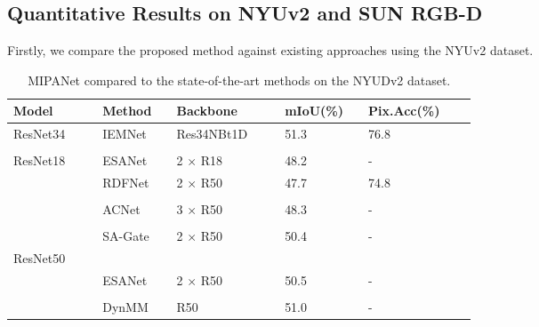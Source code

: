 \documentclass{aims}
\numberwithin{equation}{section}
\begin{document}
\subsection{Quantitative Results on NYUv2 and SUN RGB-D}
Firstly, we compare the proposed method against existing approaches using the NYUv2 dataset.

\begin{table}[!htb]
  \centering
  \caption{MIPANet compared to the state-of-the-art methods on the NYUDv2 dataset.}
    \begin{tabular}{lllllllllllll}
    \toprule
    \toprule
    Model &       &       & Method &       &        Backbone &       &       & mIoU(\%)  &       &        Pix.Acc(\%) \\
    \midrule
    ResNet34 &       &       & IEMNet\cite{xu2023interactive}  &       &        Res34NBt1D &       &       & 51.3  &       &       76.8 \\
    \midrule
    &       &       &       &       &       &       &       &       &       &       &         \\
    ResNet18 &       &       & ESANet\cite{seichter2021efficient} &       &        2 $\times$ R18 &       &       & 48.2  &       &        - \\
    \midrule
          &       &       & RDFNet\cite{park2017rdfnet} &       &        2 $\times$  R50 &       &       & 47.7  &       &       74.8 \\
          &       &       &       &       &       &       &       &       &       &       &         \\
          &       &       & ACNet\cite{hu2019acnet} &       &        3 $\times$  R50 &       &       & 48.3  &       &        - \\
          &       &       &       &       &       &       &       &       &       &       &         \\
          &       &       & SA-Gate\cite{chen2020bi} &       &        2 $\times$  R50 &       &       & 50.4  &       &        - \\
    ResNet50 &       &       &       &       &       &       &       &       &       &       &         \\
          &       &       & ESANet &       &        2 $\times$  R50 &       &       & 50.5  &       &        - \\
          &       &       &       &       &       &       &       &       &       &       &         \\
          &       &       & DynMM\cite{xue2023dynamic} &       &        R50   &       &       & 51.0    &       &       - \\

\end{tabular}
\end{table}
\end{document}
